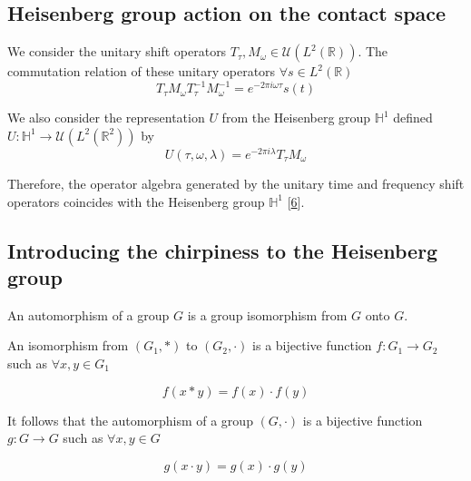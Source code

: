 \documentclass[american,]{article}
\theoremstyle{definition}
\theoremstyle{definition}
\theoremstyle{definition}
\theoremstyle{remark}
\begin{document}
\hypertarget{heisenberg-group-action-on-the-contact-space}{%
\subsection{Heisenberg group action on the contact space}\label{heisenberg-group-action-on-the-contact-space}}

We consider the unitary shift operators \(T_\tau,M_\omega\in\mathcal{U}(L^2(\mathbb{R}))\).
The commutation relation of these unitary operators \(\forall s\in L^2(\mathbb{R})\)
\begin{equation}
T_\tau M_\omega T_\tau^{-1} M_\omega^{-1} = e^{-2\pi i\omega\tau}s(t)
\end{equation}

We also consider the representation \(U\) from the Heisenberg group \(\mathbb{H}^1\)
defined \(U:\mathbb{H}^1\rightarrow\mathcal{U}(L^2(\mathbb{R}^2))\) by
\begin{equation}
U(\tau,\omega,\lambda) = e^{-2\pi i\lambda}T_\tau M_\omega
\end{equation}

Therefore, the operator algebra generated by the unitary time and frequency shift
operators coincides with the Heisenberg group \(\mathbb{H}^1\) {[}\protect\hyperlink{ref-boscain2021}{6}{]}.

\hypertarget{introducing-the-chirpiness-to-the-heisenberg-group}{%
\subsection{Introducing the chirpiness to the Heisenberg group}\label{introducing-the-chirpiness-to-the-heisenberg-group}}

An automorphism of a group \(G\) is a group isomorphism from \(G\) onto \(G\).

An isomorphism from \((G_1,*)\) to \((G_2,\cdot)\) is a bijective function
\(f:G_1\rightarrow G_2\) such as \(\forall x,y\in G_1\)

\begin{equation}
f(x*y) = f(x)\cdot f(y)
\end{equation}

It follows that the automorphism of a group \((G,\cdot)\) is a bijective function
\(g:G\rightarrow G\) such as \(\forall x,y\in G\)

\begin{equation}\label{eq:aut_g}
g(x\cdot y) = g(x)\cdot g(y)
\end{equation}
\end{document}
